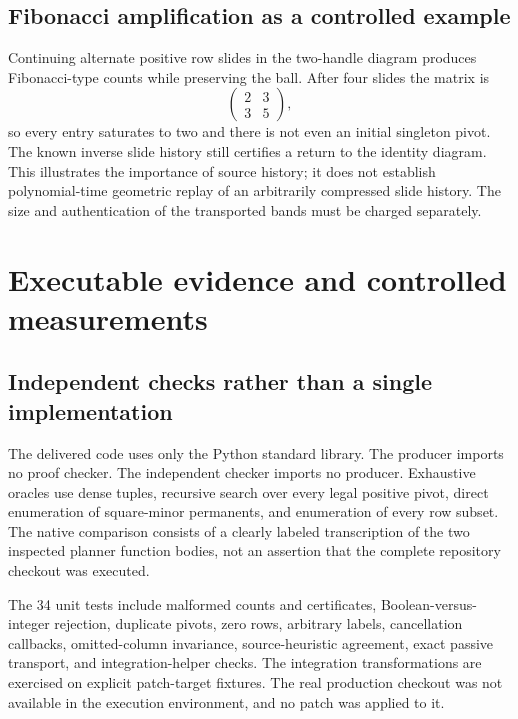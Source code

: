 \documentclass[11pt]{article}
\theoremstyle{definition}\newtheorem{definition}[theorem]{Definition}
\theoremstyle{remark}\newtheorem{remark}[theorem]{Remark}
\begin{document}
\subsection{Fibonacci amplification as a controlled example}
Continuing alternate positive row slides in the two-handle diagram produces Fibonacci-type counts while preserving the ball. After four slides the matrix is
\[
 \begin{pmatrix}2&3\\3&5\end{pmatrix},
\]
so every entry saturates to two and there is not even an initial singleton pivot. The known inverse slide history still certifies a return to the identity diagram. This illustrates the importance of source history; it does not establish polynomial-time geometric replay of an arbitrarily compressed slide history. The size and authentication of the transported bands must be charged separately.

\section{Executable evidence and controlled measurements}
\label{sec:evidence}

\subsection{Independent checks rather than a single implementation}
The delivered code uses only the Python standard library. The producer imports no proof checker. The independent checker imports no producer. Exhaustive oracles use dense tuples, recursive search over every legal positive pivot, direct enumeration of square-minor permanents, and enumeration of every row subset. The native comparison consists of a clearly labeled transcription of the two inspected planner function bodies, not an assertion that the complete repository checkout was executed.

The 34 unit tests include malformed counts and certificates, Boolean-versus-integer rejection, duplicate pivots, zero rows, arbitrary labels, cancellation callbacks, omitted-column invariance, source-heuristic agreement, exact passive transport, and integration-helper checks. The integration transformations are exercised on explicit patch-target fixtures. The real production checkout was not available in the execution environment, and no patch was applied to it.
\end{document}
